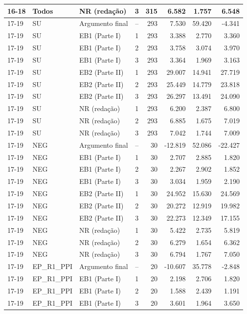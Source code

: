 \begin{longtable}{lllcrrrr}
16-18 & Todos & NR (redação) & 3 & 315 & 6.582 & 1.757 & 6.548 \\
\midrule
17-19 & SU & Argumento final & -- & 293 & 7.530 & 59.420 & -4.341 \\
17-19 & SU & EB1 (Parte I) & 1 & 293 & 3.388 & 2.770 & 3.360 \\
17-19 & SU & EB1 (Parte I) & 2 & 293 & 3.758 & 3.074 & 3.970 \\
17-19 & SU & EB1 (Parte I) & 3 & 293 & 3.364 & 1.969 & 3.163 \\
17-19 & SU & EB2 (Parte II) & 1 & 293 & 29.007 & 14.941 & 27.719 \\
17-19 & SU & EB2 (Parte II) & 2 & 293 & 25.449 & 14.779 & 23.818 \\
17-19 & SU & EB2 (Parte II) & 3 & 293 & 26.297 & 13.491 & 24.090 \\
17-19 & SU & NR (redação) & 1 & 293 & 6.200 & 2.387 & 6.800 \\
17-19 & SU & NR (redação) & 2 & 293 & 6.885 & 1.675 & 7.019 \\
17-19 & SU & NR (redação) & 3 & 293 & 7.042 & 1.744 & 7.009 \\
17-19 & NEG & Argumento final & -- & 30 & -12.819 & 52.086 & -22.427 \\
17-19 & NEG & EB1 (Parte I) & 1 & 30 & 2.707 & 2.885 & 1.820 \\
17-19 & NEG & EB1 (Parte I) & 2 & 30 & 2.267 & 2.902 & 1.852 \\
17-19 & NEG & EB1 (Parte I) & 3 & 30 & 3.034 & 1.959 & 2.190 \\
17-19 & NEG & EB2 (Parte II) & 1 & 30 & 24.952 & 15.630 & 24.569 \\
17-19 & NEG & EB2 (Parte II) & 2 & 30 & 20.272 & 12.919 & 19.982 \\
17-19 & NEG & EB2 (Parte II) & 3 & 30 & 22.273 & 12.349 & 17.155 \\
17-19 & NEG & NR (redação) & 1 & 30 & 5.422 & 2.735 & 5.819 \\
17-19 & NEG & NR (redação) & 2 & 30 & 6.279 & 1.654 & 6.362 \\
17-19 & NEG & NR (redação) & 3 & 30 & 6.794 & 1.767 & 7.050 \\
17-19 & EP\_R1\_PPI & Argumento final & -- & 20 & -10.607 & 35.778 & -2.848 \\
17-19 & EP\_R1\_PPI & EB1 (Parte I) & 1 & 20 & 2.198 & 2.706 & 1.820 \\
17-19 & EP\_R1\_PPI & EB1 (Parte I) & 2 & 20 & 1.588 & 2.439 & 1.191 \\
17-19 & EP\_R1\_PPI & EB1 (Parte I) & 3 & 20 & 3.601 & 1.964 & 3.650 \\

\end{longtable}
